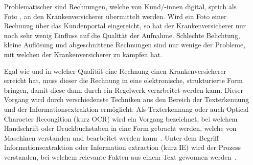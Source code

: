 Problematischer sind Rechnungen, welche von Kund/-innen digital, sprich als Foto , an den Krankenversicherer übermittelt werden. Wird ein Foto einer Rechnung über das Kundenportal eingereicht, so hat der Krankenversicherer nur noch sehr wenig Einfluss auf die Qualität der Aufnahme. Schlechte Belichtung, kleine Auflösung und abgeschnittene Rechnungen sind nur wenige der Probleme, mit welchen der Krankenversicherer zu kämpfen hat.

Egal wie und in welcher Qualität eine Rechnung einen Krankenversicherer erreicht hat, muss dieser die Rechnung in eine elektronische, strukturierte Form bringen, damit diese dann durch ein Regelwerk verarbeitet werden kann. Dieser Vorgang wird durch verschiedenste Techniken aus den Bereich der Texterkennung und der Informationsextraktion ermöglicht. Als Texterkennung oder auch Optical Character Recongition (kurz OCR) wird ein Vorgang bezeichnet, bei welchem Handschrift oder Druckbuchstaben in eine Form gebracht werden, welche von Maschinen verstanden und bearbeitet werden kann~\autocite{Xue2014}. Unter dem Begriff Informationsextraktion oder Information extraction (kurz IE) wird der Prozess verstanden, bei welchem relevante Fakten aus einem Text gewonnen werden~\autocite{Piskorski2012}.




